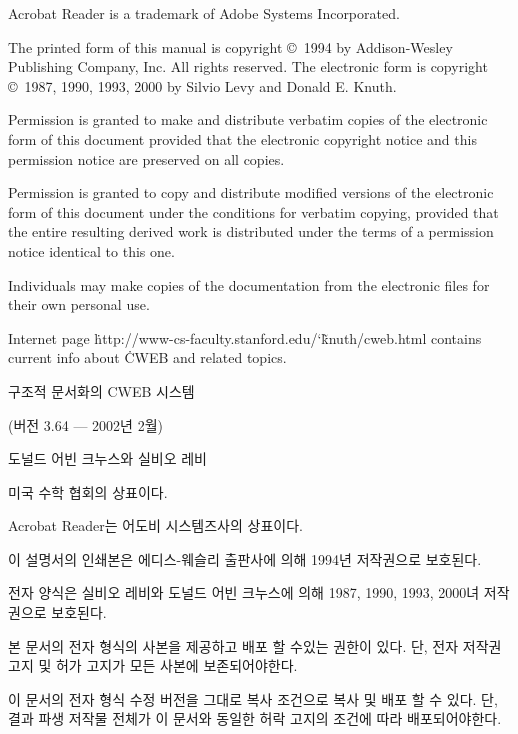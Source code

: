 \noindent
Acrobat Reader is a trademark of Adobe Systems Incorporated.

\bigskip\noindent
The printed form of this manual is copyright \copyright\ 1994
  by Addison-Wesley Publishing Company, Inc.  All rights reserved.
\smallskip\noindent
The electronic form is copyright \copyright\ 1987, 1990, 1993, 2000
  by Silvio Levy and Donald E. Knuth.

\bigskip\noindent
Permission is granted to make and distribute verbatim copies of the
electronic form of this document provided that the electronic copyright
notice and this permission notice are preserved on all copies.

\smallskip\noindent
Permission is granted to copy and distribute modified versions of the
electronic form of this document under the conditions for verbatim copying,
provided that the entire resulting derived work is distributed under the terms
of a permission notice identical to this one.

\smallskip\noindent
Individuals may make copies of the documentation from the electronic files
for their own personal use.

\smallskip\noindent
Internet page \.{http://www-cs-faculty.stanford.edu/\char`\~knuth/cweb.html}
contains current info about \.{CWEB} and related topics.

 \titletrue\eject


\null\vfill
\baselineskip 15pt

\centerline{\titlefont 구조적 문서화의 {\ttitlefont CWEB} 시스템}
\vskip 18pt\centerline{(버전 3.64 --- 2002년 2월)}
\vskip 24pt
\centerline{ 도널드 어빈 크누스와 실비오 레비}
\vfill

\noindent
{} 미국 수학 협회의 상표이다.

\noindent
Acrobat Reader는 어도비 시스템즈사의 상표이다.

\bigskip\noindent
이 설명서의 인쇄본은 에디스-웨슬리 출판사에 의해 1994년 저작권으로 보호된다.

\smallskip\noindent
전자 양식은 실비오 레비와 도널드 어빈 크누스에 의해 1987, 1990, 1993, 2000녀 저작권으로
보호된다.

\bigskip\noindent
본 문서의 전자 형식의 사본을 제공하고 배포 할 수있는 권한이 있다. 단, 전자 저작권 고지 및
허가 고지가 모든 사본에 보존되어야한다.

\smallskip\noindent
이 문서의 전자 형식 수정 버전을 그대로 복사 조건으로 복사 및 배포 할 수 있다.
단, 결과 파생 저작물 전체가 이 문서와 동일한 허락 고지의 조건에 따라 배포되어야한다.

